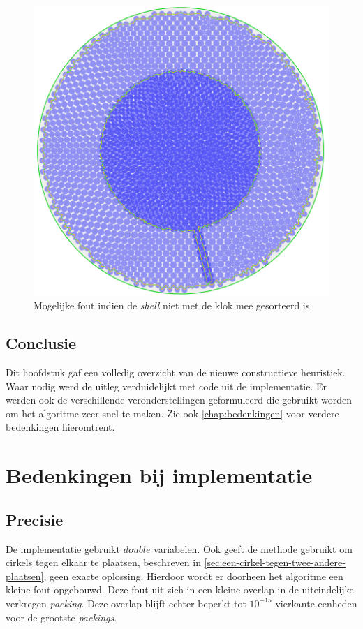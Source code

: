 \documentclass[12pt,a4paper,oneside]{book}
\begin{document}
{\begin{figure}
  \centering
  \includegraphics[width=.65\textwidth]{plaats-op-shell-hoek-fout.png}
  \caption{Mogelijke fout indien de \textit{shell} niet met de klok mee gesorteerd is} \label{fig:plaats-op-shell-hoek-fout} 
\end{figure}

\section{Conclusie}

Dit hoofdstuk gaf een volledig overzicht van de nieuwe constructieve heuristiek.
Waar nodig werd de uitleg verduidelijkt met code uit de implementatie.
Er werden ook de verschillende veronderstellingen geformuleerd die gebruikt worden om het algoritme zeer snel te maken.
Zie ook \autoref{chap:bedenkingen} voor verdere bedenkingen hieromtrent.


\chapter{Bedenkingen bij implementatie} \label{chap:bedenkingen}

\section{Precisie}

De implementatie gebruikt $double$ variabelen.
Ook geeft de methode gebruikt om cirkels tegen elkaar te plaatsen, beschreven in \autoref{sec:een-cirkel-tegen-twee-andere-plaatsen}, geen exacte oplossing.
Hierdoor wordt er doorheen het algoritme een kleine fout opgebouwd. %
Deze fout uit zich in een kleine overlap in de uiteindelijke verkregen \textit{packing}. %
Deze overlap blijft echter beperkt tot $10^{-15}$ vierkante eenheden voor de grootste \textit{packings}.

}
\end{document}
